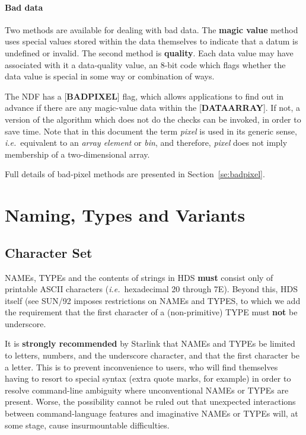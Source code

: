 \documentclass[twoside,11pt]{article}
\newcommand{\htmlref}[2]{#1}
\newcommand{\html}[1]{}
\newcommand{\latex}[1]{#1}
\newcommand{\xref}[3]{#1}
\newcommand{\xlabel}[1]{}
\renewcommand{\_}{\texttt{\symbol{95}}}
\begin{document}
\paragraph{Bad data}
Two methods are available for dealing with bad data.  The
{\bf magic value} method uses special values
stored within the data themselves to
indicate that a datum is undefined or invalid.  The second method is
{\bf quality}.  Each data value may have associated with
it a data-quality value, an 8-bit
code which flags whether the data value is special
in some way or combination of ways.

The NDF has a {[}{\bf BAD\_PIXEL}{]} flag, which allows applications
to find out in advance if there are any
magic-value data within the {[}{\bf DATA\_ARRAY}{]}.  If not, a
version of the algorithm which does not do the checks can be
invoked, in order to save time.  Note that in this document the term
{\em pixel} is used in its generic sense, {\it i.e.}\ equivalent to
an {\em array element} or {\em bin}, and therefore, {\em pixel}
does not imply membership of a two-dimensional array.

Full details of bad-pixel methods are presented \latex{in
Section~\ref{se:badpixel}.}\html{\htmlref{here.}{se:badpixel}}

\section{\xlabel{se_natyvar}Naming, Types and
Variants\label{se:natyvar}}

\subsection{\xlabel{se_charset}Character Set\label{se:charset}}

NAMEs, TYPEs and the contents of strings in HDS
{\bf must} consist only of
printable ASCII characters ({\it i.e.}\ hexadecimal
20 through 7E).  Beyond this, HDS itself
(see \xref{SUN/92}{sun92}) imposes restrictions on NAMEs and TYPES,
to which we add the
requirement that the first character of a
(non-primitive) TYPE must {\bf not} be
underscore.

It is {\bf strongly recommended} by Starlink that NAMEs and TYPEs
be limited to letters, numbers, and the underscore character, and
that the first character be a letter.  This is to
prevent inconvenience
to users, who will find themselves having to resort
to special syntax (extra quote marks, for example) in order to
resolve
command-line ambiguity where unconventional NAMEs or TYPEs are
present.  Worse, the possibility cannot be ruled out that
unexpected interactions
between command-language features and imaginative NAMEs or TYPEs
will, at some stage, cause insurmountable difficulties.
\end{document}
